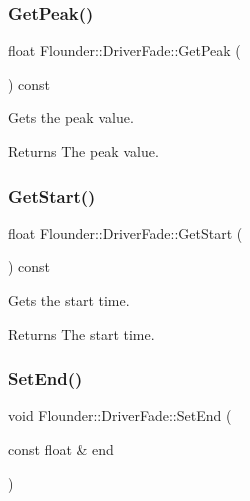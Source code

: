 \subsubsection{\texorpdfstring{Get\+Peak()}{GetPeak()}}
{\footnotesize\ttfamily float Flounder\+::\+Driver\+Fade\+::\+Get\+Peak (\begin{DoxyParamCaption}{ }\end{DoxyParamCaption}) const\hspace{0.3cm}{\ttfamily [inline]}}



Gets the peak value. 

\begin{DoxyReturn}{Returns}
The peak value. 
\end{DoxyReturn}
\mbox{\label{class_flounder_1_1_driver_fade_a94ad7197e044e6f2ea2b8ada7d3174a1}} 
\subsubsection{\texorpdfstring{Get\+Start()}{GetStart()}}
{\footnotesize\ttfamily float Flounder\+::\+Driver\+Fade\+::\+Get\+Start (\begin{DoxyParamCaption}{ }\end{DoxyParamCaption}) const\hspace{0.3cm}{\ttfamily [inline]}}



Gets the start time. 

\begin{DoxyReturn}{Returns}
The start time. 
\end{DoxyReturn}
\mbox{\label{class_flounder_1_1_driver_fade_a944b5327889098faecd497b1d983f2cc}} 
\subsubsection{\texorpdfstring{Set\+End()}{SetEnd()}}
{\footnotesize\ttfamily void Flounder\+::\+Driver\+Fade\+::\+Set\+End (\begin{DoxyParamCaption}\item[{const float \&}]{end }\end{DoxyParamCaption})\hspace{0.3cm}{\ttfamily [inline]}}



